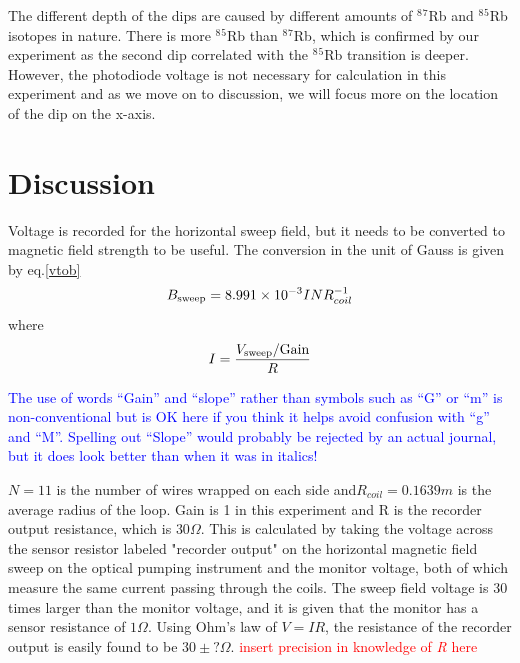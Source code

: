 \documentclass[prb,preprint]{revtex4-1}
\begin{document}
The different depth of the dips are caused by different amounts of $^8$$^7$Rb and $^8$$^5$Rb isotopes in nature. There is more $^8$$^5$Rb than $^8$$^7$Rb, which is confirmed by our experiment as the second dip correlated with the  $^8$$^5$Rb transition is deeper. However, the photodiode voltage is not necessary for calculation in this experiment and as we move on to discussion, we will focus more on the location of the dip on the x-axis.\\

\section{Discussion}
Voltage is recorded for the horizontal sweep field, but it needs to be converted to magnetic field strength to be useful. The conversion in the unit of Gauss is given by eq.\ref{vtob}
\begin{equation}
B_{\textnormal{sweep}}=8.991\times10^{-3} I N R_{coil}^{-1}
\label{vtob}
\end{equation}
\vspace*{-0.25cm}
where
\vspace*{-0.5cm}
\begin{equation}
I=\frac{V_{\textnormal{sweep}}/{\textrm{Gain}}}{R}
\label{vtoi}
\end{equation}

\textcolor{blue}{The use of words ``Gain'' and ``slope''  rather than symbols such as ``G'' or ``m'' is non-conventional but is OK here if you think it helps avoid confusion with ``g'' and ``M''. Spelling out ``Slope'' would probably be rejected by an actual journal, but it does look better than when it was in italics! } 

$N=11$ is the number of wires wrapped on each side and$R_{coil}=0.1639m$ is the average radius of the loop. Gain is 1 in this experiment and R is the recorder output resistance, which is $30 \Omega$. This is calculated by taking the voltage across the sensor resistor labeled "recorder output" on the horizontal magnetic field sweep on the optical pumping instrument and the monitor voltage, both of which measure the same current passing through the coils. The sweep field voltage is 30 times larger than the monitor voltage, and it is given that the monitor has a sensor resistance of $1 \Omega$. Using Ohm's law of $V=IR$, the resistance of the recorder output is easily found to be $30 \pm ? \Omega $. \textcolor{red}{insert precision in knowledge of \textit{R} here}\\
\end{document}
